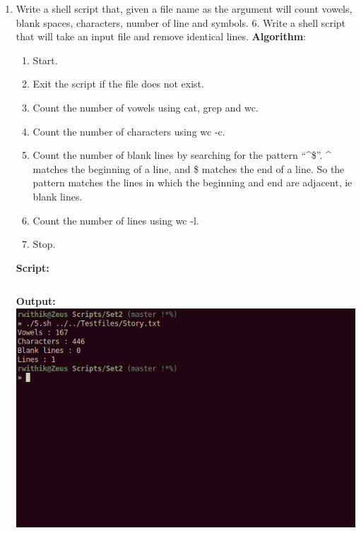 \documentclass[10pt,a4paper,titlepage]{report}
\begin{document}
\begin{enumerate}
\item Write a shell script that, given a file name as the argument will count vowels, blank spaces, characters, number of line and symbols. 6. Write a shell script that will take an input file and remove identical lines. \newline
\textbf{Algorithm}:\newline
\begin{enumerate}
	\item Start.
	\item Exit the script if the file does not exist.
	\item Count the number of vowels using {\color{red}cat}, {\color{red}grep} and {\color{red}wc}.
	\item Count the number of characters using {\color{red}wc -c}.
	\item Count the number of blank lines by searching for the pattern ``\^{}\$''. \^{} matches the beginning of a line, and \$ matches the end of a line. So the pattern matches the lines in which the beginning and end are adjacent, ie blank lines.
	\item Count the number of lines using {\color{red}wc -l}.
	\item Stop.
\end{enumerate}
\newline
\textbf{Script:}\newline
\inputminted{bash}{../Scripts/Set2/5.sh}
\newline
\textbf{Output:}\newline
\includegraphics[width=\linewidth]{../Images/Shell2/5.png}
\pagebreak


\end{enumerate}
\end{document}
